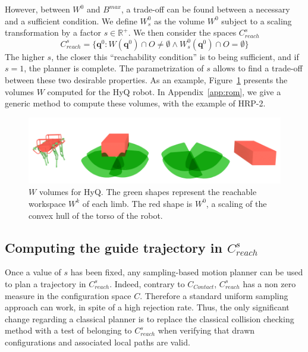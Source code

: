 However, between $W^0$ and $B^{max}$, a trade-off can be found between a necessary and a sufficient condition. We define $W^0_s$ as the volume $W^0$ subject to a scaling transformation by a factor $s \in \mathbb{R}^+$. 
%
We then consider the spaces $C_{reach}^s$
 \begin{equation}
C_{reach}^s = \{ \mathbf{q}^0 : W(\mathbf{q}^{0}) \cap O \neq \emptyset \wedge W^0_s(\mathbf{q}^{0}) \cap O = \emptyset \} %
\end{equation}
%
The higher $s$, the closer this ``reachability condition'' is to being sufficient, and if $s=1$, the planner is complete. The parametrization of $s$ allows to find a trade-off between these two desirable properties.
As an example, Figure~\ref{fig:HyQ_roms} presents the volumes $W$ computed for the HyQ robot.
In Appendix~\ref{app:rom}, we give a generic method to compute these volumes, with the example of HRP-2.

\begin{figure}
  \centering
  \includegraphics[width=0.95\linewidth]{figures/HyQ_roms}
  \caption{
           $W$ volumes for HyQ. The green shapes represent the reachable workspace $W^k$ of each limb. The red shape is $W^0$, a scaling of the convex hull
           of the torso of the robot.}
		   \label{fig:HyQ_roms}
\end{figure}

\subsection{Computing the guide trajectory in $C_{reach}^s$}
Once a value of $s$ has been fixed, any sampling-based motion planner can be used to plan a trajectory in $C_{reach}^s$. 
Indeed, contrary to $C_{Contact}$,  $C_{reach}^s$ has a non zero measure in the configuration space $C$. Therefore a standard uniform sampling approach
can work, in spite of a high rejection rate. 
Thus, the only significant change regarding a classical planner is to replace the classical collision checking method with a test of belonging to $C_{reach}^s$ when verifying
that drawn configurations and associated local paths are valid.

